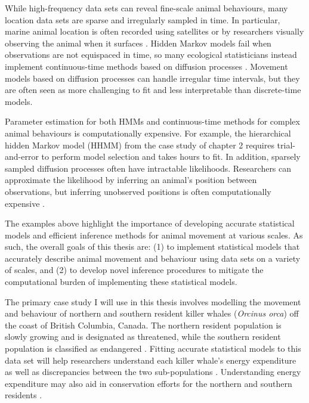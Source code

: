 While high-frequency data sets can reveal fine-scale animal behaviours, many location data sets are sparse and irregularly sampled in time. In particular, marine animal location is often recorded using satellites \citep{Gryba:2019} or by researchers visually observing the animal when it surfaces \citep{Hartman:2020}. Hidden Markov models fail when observations are not equispaced in time, so many ecological statisticians instead implement continuous-time methods based on diffusion processes \citep{Blackwell:2016, Michelot:2019b}. Movement models based on diffusion processes can handle irregular time intervals, but they are often seen as more challenging to fit and less interpretable than discrete-time models.

Parameter estimation for both HMMs and continuous-time methods for complex animal behaviours is computationally expensive. For example, the hierarchical hidden Markov model (HHMM) from the case study of chapter 2 requires trial-and-error to perform model selection and takes hours to fit. In addition, sparsely sampled diffusion processes often have intractable likelihoods. Researchers can approximate the likelihood by inferring an animal's position between observations, but inferring unobserved positions is often computationally expensive \citep{Lindstrom:2012}.


The examples above highlight the importance of developing accurate statistical models and efficient inference methods for animal movement at various scales. As such, the overall goals of this thesis are: (1) to implement statistical models that accurately describe animal movement and behaviour using data sets on a variety of scales, and (2) to develop novel inference procedures to mitigate the computational burden of implementing these statistical models.

The primary case study I will use in this thesis involves modelling the movement and behaviour of northern and southern resident killer whales (\textit{Orcinus orca}) off the coast of British Columbia, Canada. The northern resident population is slowly growing and is designated as threatened, while the southern resident population is classified as endangered \citep{DFO:2018}. Fitting accurate statistical models to this data set will help researchers understand each killer whale's energy expenditure as well as discrepancies between the two sub-populations \citep{Green:2009, Dot:2016, Wilson:2019}. Understanding energy expenditure may also aid in conservation efforts for the northern and southern residents \citep{Noren:2011}.

